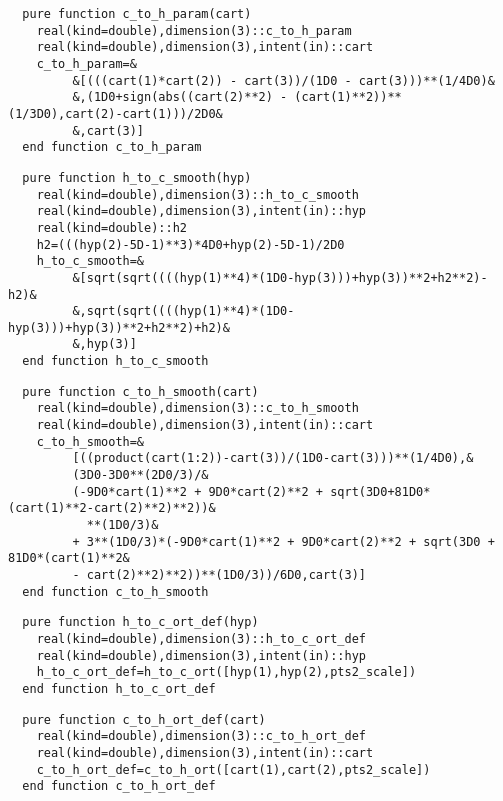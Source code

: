 \begin{Verbatim}
  pure function c_to_h_param(cart)
    real(kind=double),dimension(3)::c_to_h_param
    real(kind=double),dimension(3),intent(in)::cart
    c_to_h_param=&
         &[(((cart(1)*cart(2)) - cart(3))/(1D0 - cart(3)))**(1/4D0)&
         &,(1D0+sign(abs((cart(2)**2) - (cart(1)**2))**(1/3D0),cart(2)-cart(1)))/2D0&
         &,cart(3)]
  end function c_to_h_param
\end{Verbatim}

\begin{Verbatim}
  pure function h_to_c_smooth(hyp)
    real(kind=double),dimension(3)::h_to_c_smooth
    real(kind=double),dimension(3),intent(in)::hyp
    real(kind=double)::h2
    h2=(((hyp(2)-5D-1)**3)*4D0+hyp(2)-5D-1)/2D0
    h_to_c_smooth=&
         &[sqrt(sqrt((((hyp(1)**4)*(1D0-hyp(3)))+hyp(3))**2+h2**2)-h2)&
         &,sqrt(sqrt((((hyp(1)**4)*(1D0-hyp(3)))+hyp(3))**2+h2**2)+h2)&
         &,hyp(3)]
  end function h_to_c_smooth
\end{Verbatim}
  
\begin{Verbatim}
  pure function c_to_h_smooth(cart)
    real(kind=double),dimension(3)::c_to_h_smooth
    real(kind=double),dimension(3),intent(in)::cart
    c_to_h_smooth=&
         [((product(cart(1:2))-cart(3))/(1D0-cart(3)))**(1/4D0),&
         (3D0-3D0**(2D0/3)/&
         (-9D0*cart(1)**2 + 9D0*cart(2)**2 + sqrt(3D0+81D0*(cart(1)**2-cart(2)**2)**2))&
           **(1D0/3)&
         + 3**(1D0/3)*(-9D0*cart(1)**2 + 9D0*cart(2)**2 + sqrt(3D0 + 81D0*(cart(1)**2&
         - cart(2)**2)**2))**(1D0/3))/6D0,cart(3)]
  end function c_to_h_smooth
\end{Verbatim}

\begin{Verbatim}
  pure function h_to_c_ort_def(hyp)
    real(kind=double),dimension(3)::h_to_c_ort_def
    real(kind=double),dimension(3),intent(in)::hyp
    h_to_c_ort_def=h_to_c_ort([hyp(1),hyp(2),pts2_scale])
  end function h_to_c_ort_def
\end{Verbatim}
  
\begin{Verbatim}
  pure function c_to_h_ort_def(cart)
    real(kind=double),dimension(3)::c_to_h_ort_def
    real(kind=double),dimension(3),intent(in)::cart
    c_to_h_ort_def=c_to_h_ort([cart(1),cart(2),pts2_scale])
  end function c_to_h_ort_def
\end{Verbatim}
  
